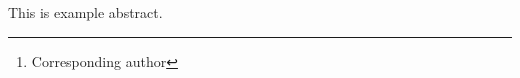 \documentclass[12pt, a4paper]{article} %
\begin{document}

\renewcommand{\abstractname}{\large TITLE}
\begin{abstract}
    \normalsize %
    \bigskip %
    \noindent I.~A.~Ivanov\footnote[*]{Corresponding author}, N.~A.~Sidorov \\
    \noindent Institute of Cytology and Genetics SB RAS, Novosibirsk, Russia \\
    \noindent e-mail: ivanov@bionet.nsc.ru \\
\end{abstract}

This is example abstract.
\end{document}
